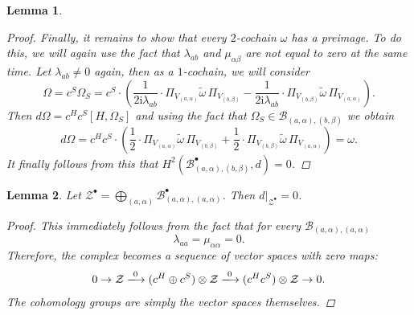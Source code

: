 \documentclass[10pt,a4paper]{amsart}
\newtheorem{lemma}{Lemma}
\begin{document}
\begin{lemma}
\begin{proof}
        Finally, it remains to show that every $2$-cochain $\omega$ has a preimage. To do this, we will again use the fact that $\lambda_{ab}$ and $\mu_{\alpha\beta}$ are not equal to zero at the same time. Let $\lambda_{ab}\neq 0$ again, then as a $1$-cochain, we will consider
        \begin{equation}
            \Omega=c^{S}\Omega_{S}=c^{S}\cdot\left(\frac{1}{2\mathrm{i}\lambda_{ab}}\cdot \Pi_{V_{(a,\alpha)}}\tilde{\omega}\,\Pi_{V_{(b,\beta)}}-\frac{1}{2\mathrm{i}\lambda_{ab}}\cdot \Pi_{V_{(b,\beta)}}\tilde{\omega}\,\Pi_{V_{(a,\alpha)}}\right).
        \end{equation}
        Then $d\Omega=c^{H}c^{S}[H,\Omega_{S}]$ and using the fact that $\Omega_{S}\in\mathcal{B}_{(a,\alpha),(b,\beta)}$ we obtain
        \begin{equation}
            d\Omega=c^{H}c^{S}\cdot\left(\frac{1}{2}\cdot \Pi_{V_{(a,\alpha)}}\tilde{\omega}\,\Pi_{V_{(b,\beta)}}+\frac{1}{2}\cdot \Pi_{V_{(b,\beta)}}\tilde{\omega}\,\Pi_{V_{(a,\alpha)}}\right)=\omega.
        \end{equation}
        It finally follows from this that $H^{2}(\mathcal{B}^{\bullet}_{(a,\alpha),(b,\beta)},d)=0$.
        \end{proof}
\end{lemma}

\begin{lemma} \label{prop:zero-diff}
    Let $\mathcal{Z}^{\bullet}=\bigoplus_{(a,\alpha)}\mathcal{B}_{(a,\alpha),(a,\alpha)}^{\bullet}$. Then $d|_{\mathcal{Z}^{\bullet}}=0$.
    \begin{proof}
        This immediately follows from the fact that for every $\mathcal{B}_{(a,\alpha),(a,\alpha)}$
        \begin{equation}
            \lambda_{aa}=\mu_{\alpha\alpha}=0.
        \end{equation}
        Therefore, the complex becomes a sequence of vector spaces with zero maps:
        \begin{equation}
            0\rightarrow\mathcal{Z}\xlongrightarrow{0}(c^H\oplus c^S)\otimes\mathcal{Z}\xlongrightarrow{0}(c^H c^S)\otimes\mathcal{Z}\rightarrow 0.
        \end{equation}
        The cohomology groups are simply the vector spaces themselves.
    \end{proof}
\end{lemma}
\end{document}

